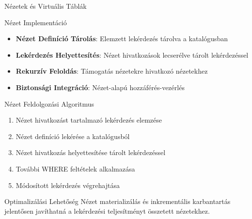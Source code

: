 \documentclass[aspectratio=169]{beamer}
\begin{document}
\begin{frame}{Nézetek és Virtuális Táblák}
\begin{block}{Nézet Implementáció}
\begin{itemize}
    \item \textbf{Nézet Definíció Tárolás}: Elemzett lekérdezés tárolva a katalógusban
    \item \textbf{Lekérdezés Helyettesítés}: Nézet hivatkozások lecserélve tárolt lekérdezéssel
    \item \textbf{Rekurzív Feloldás}: Támogatás nézetekre hivatkozó nézetekhez
    \item \textbf{Biztonsági Integráció}: Nézet-alapú hozzáférés-vezérlés
\end{itemize}
\end{block}

\begin{block}{Nézet Feldolgozási Algoritmus}
\begin{enumerate}
    \item Nézet hivatkozást tartalmazó lekérdezés elemzése
    \item Nézet definíció lekérése a katalógusból
    \item Nézet hivatkozás helyettesítése tárolt lekérdezéssel
    \item További WHERE feltételek alkalmazása
    \item Módosított lekérdezés végrehajtása
\end{enumerate}
\end{block}

\begin{alertblock}{Optimalizálási Lehetőség}
Nézet materializálás és inkrementális karbantartás jelentősen javíthatná a lekérdezési teljesítményt összetett nézetekhez.
\end{alertblock}
\end{frame}
\end{document}

